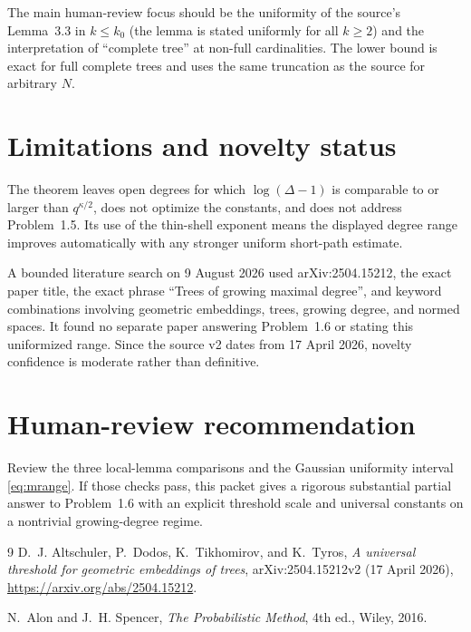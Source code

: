 \documentclass[11pt]{article}
\begin{document}
The main human-review focus should be the uniformity of the source's
Lemma~3.3 in $k\leq k_0$ (the lemma is stated uniformly for all $k\geq2$) and
the interpretation of ``complete tree'' at non-full cardinalities. The lower
bound is exact for full complete trees and uses the same truncation as the
source for arbitrary $N$.

\section*{Limitations and novelty status}

The theorem leaves open degrees for which
$\log(\Delta-1)$ is comparable to or larger than $q^{\kappa/2}$, does not
optimize the constants, and does not address Problem~1.5. Its use of the
thin-shell exponent means the displayed degree range improves automatically
with any stronger uniform short-path estimate.

A bounded literature search on 9 August 2026 used arXiv:2504.15212, the exact
paper title, the exact phrase ``Trees of growing maximal degree'', and keyword
combinations involving geometric embeddings, trees, growing degree, and
normed spaces. It found no separate paper answering Problem~1.6 or stating
this uniformized range. Since the source v2 dates from 17 April 2026, novelty
confidence is moderate rather than definitive.

\section*{Human-review recommendation}

Review the three local-lemma comparisons and the Gaussian uniformity interval
\eqref{eq:mrange}. If those checks pass, this packet gives a rigorous
substantial partial answer to Problem~1.6 with an explicit threshold scale and
universal constants on a nontrivial growing-degree regime.

\begin{thebibliography}{9}
D.~J. Altschuler, P.~Dodos, K.~Tikhomirov, and K.~Tyros,
\emph{A universal threshold for geometric embeddings of trees},
arXiv:2504.15212v2 (17 April 2026),
\url{https://arxiv.org/abs/2504.15212}.

N.~Alon and J.~H. Spencer,
\emph{The Probabilistic Method}, 4th ed., Wiley, 2016.
\end{thebibliography}
\end{document}
